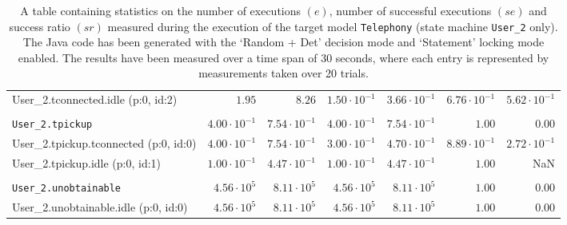 \begin{table}[htbp]
{\begin{tabular}{lrrrrrr}
\hspace{3mm}User\_2.tconnected.idle (p:0, id:2)       &               $1.95$ &               $8.26$ & $1.50 \cdot 10^{-1}$ & $3.66 \cdot 10^{-1}$ & $6.76 \cdot 10^{-1}$ & $5.62 \cdot 10^{-1}$ \\
\\[-8pt]\texttt{User\_2.tpickup}                      & $4.00 \cdot 10^{-1}$ & $7.54 \cdot 10^{-1}$ & $4.00 \cdot 10^{-1}$ & $7.54 \cdot 10^{-1}$ &               $1.00$ &               $0.00$ \\
\hspace{3mm}User\_2.tpickup.tconnected (p:0, id:0)    & $4.00 \cdot 10^{-1}$ & $7.54 \cdot 10^{-1}$ & $3.00 \cdot 10^{-1}$ & $4.70 \cdot 10^{-1}$ & $8.89 \cdot 10^{-1}$ & $2.72 \cdot 10^{-1}$ \\
\hspace{3mm}User\_2.tpickup.idle (p:0, id:1)          & $1.00 \cdot 10^{-1}$ & $4.47 \cdot 10^{-1}$ & $1.00 \cdot 10^{-1}$ & $4.47 \cdot 10^{-1}$ &               $1.00$ &                  NaN \\
\\[-8pt]\texttt{User\_2.unobtainable}                 &  $4.56 \cdot 10^{5}$ &  $8.11 \cdot 10^{5}$ &  $4.56 \cdot 10^{5}$ &  $8.11 \cdot 10^{5}$ &               $1.00$ &               $0.00$ \\
\hspace{3mm}User\_2.unobtainable.idle (p:0, id:0)     &  $4.56 \cdot 10^{5}$ &  $8.11 \cdot 10^{5}$ &  $4.56 \cdot 10^{5}$ &  $8.11 \cdot 10^{5}$ &               $1.00$ &               $0.00$ \\
\bottomrule
\end{tabular}
}
\caption{A table containing statistics on the number of executions $(e)$, number of successful executions $(se)$ and success ratio $(sr)$ measured during the execution of the target model \texttt{Telephony} (state machine \texttt{User\_2} only). The Java code has been generated with the `Random + Det' decision mode and `Statement' locking mode enabled. The results have been measured over a time span of 30 seconds, where each entry is represented by measurements taken over 20 trials.}
\label{table:frequency_results_telephony_random_det_statement_user_2}
\end{table}
